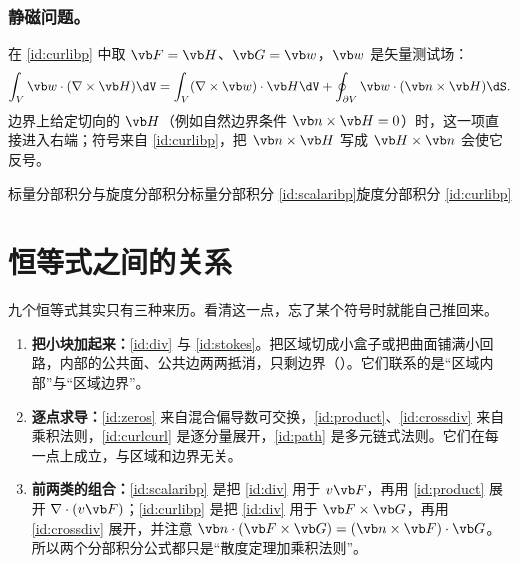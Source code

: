 \subsubsection{静磁问题。} 在 \eqref{id:curlibp} 中取 $\vb F=\vb H$、$\vb G=\vb w$，$\vb w$ 是矢量测试场：
\begin{equation*}
\int_V\vb w\cdot(\nabla\times\vb H)\dV
=\int_V(\nabla\times\vb w)\cdot\vb H\dV
+\oint_{\partial V}\vb w\cdot(\vb n\times\vb H)\dS .
\end{equation*}
边界上给定切向的 $\vb H$（例如自然边界条件 $\vb n\times\vb H=0$）时，这一项直接进入右端；符号来自 \eqref{id:curlibp}，把 $\vb n\times\vb H$ 写成 $\vb H\times\vb n$ 会使它反号。

\begin{compare}{标量分部积分与旋度分部积分}{标量分部积分 \eqref{id:scalaribp}}{旋度分部积分 \eqref{id:curlibp}}
\end{compare}

\section{恒等式之间的关系}\label{sec:app-family}

九个恒等式其实只有三种来历。看清这一点，忘了某个符号时就能自己推回来。
\begin{enumerate}
\item \textbf{把小块加起来：}\eqref{id:div} 与 \eqref{id:stokes}。把区域切成小盒子或把曲面铺满小回路，内部的公共面、公共边两两抵消，只剩边界（）。它们联系的是“区域内部”与“区域边界”。
\item \textbf{逐点求导：}\eqref{id:zeros} 来自混合偏导数可交换，\eqref{id:product}、\eqref{id:crossdiv} 来自乘积法则，\eqref{id:curlcurl} 是逐分量展开，\eqref{id:path} 是多元链式法则。它们在每一点上成立，与区域和边界无关。
\item \textbf{前两类的组合：}\eqref{id:scalaribp} 是把 \eqref{id:div} 用于 $v\vb F$，再用 \eqref{id:product} 展开 $\nabla\cdot(v\vb F)$；\eqref{id:curlibp} 是把 \eqref{id:div} 用于 $\vb F\times\vb G$，再用 \eqref{id:crossdiv} 展开，并注意 $\vb n\cdot(\vb F\times\vb G)=(\vb n\times\vb F)\cdot\vb G$。所以两个分部积分公式都只是“散度定理加乘积法则”。
\end{enumerate}

